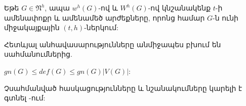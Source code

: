 Եթե $G \in \mathfrak{N}^h$, ապա $w^h(G)$-ով և $W^h(G)$-ով կնշանակենք $t$-ի ամենափոքր և ամենամեծ արժեքները, որոնց համար $G$-ն ունի միջակայքային $(t,h)$-ներկում: 

Հետևյալ անհավասարությունները անմիջապես բխում են սահմանումներից.
\begin{center}
$gn(G) \leq def(G) \leq gn(G)|V(G)|$:
\end{center}

Չսահմանված հասկացությունները և նշանակումները կարելի է գտնել \cite{AsratianDenleyHaggvist1998,Harary1969,Kubale2004,West1996,PMK2015}-ում: